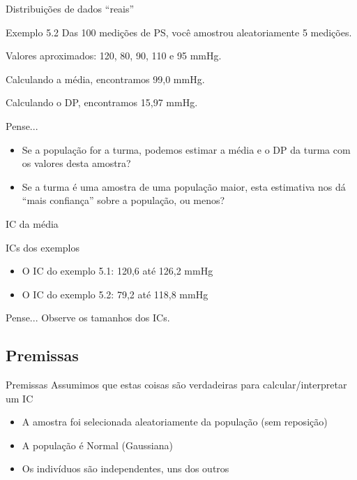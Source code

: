 \documentclass{beamer}
\begin{document}

\begin{frame}{Distribuições de dados ``reais''}
  \begin{exampleblock}{Exemplo 5.2}
    Das 100 medições de PS, você amostrou aleatoriamente 5 medições.

    Valores aproximados: 120, 80, 90, 110 e 95 mmHg.

    Calculando a média, encontramos 99,0 mmHg.

    Calculando o DP, encontramos 15,97 mmHg.
  \end{exampleblock}
  \begin{block}{Pense...}
    \begin{itemize}
    \item Se a população for a turma, podemos estimar a média e o DP da turma com os valores desta amostra?
    \item Se a turma é uma amostra de uma população maior, esta estimativa nos dá ``mais confiança'' sobre a população, ou menos?
    \end{itemize}
  \end{block}
\end{frame}

\begin{frame}{IC da média}
  \begin{exampleblock}{ICs dos exemplos}
    \begin{itemize}
    \item O IC do exemplo 5.1: 120,6 até 126,2 mmHg
    \item O IC do exemplo 5.2: 79,2 até 118,8 mmHg
    \end{itemize}
  \end{exampleblock}
  \begin{block}{Pense...}
    Observe os tamanhos dos ICs.
  \end{block}
\end{frame}

\subsection{Premissas}

\begin{frame}{Premissas}
  Assumimos que estas coisas são verdadeiras para calcular/interpretar um IC
  \begin{itemize}
  \item A amostra foi selecionada aleatoriamente da população (sem reposição)
  \item A população é Normal (Gaussiana)
  \item Os indivíduos são independentes, uns dos outros
  \end{itemize}
\end{frame}
\end{document}
